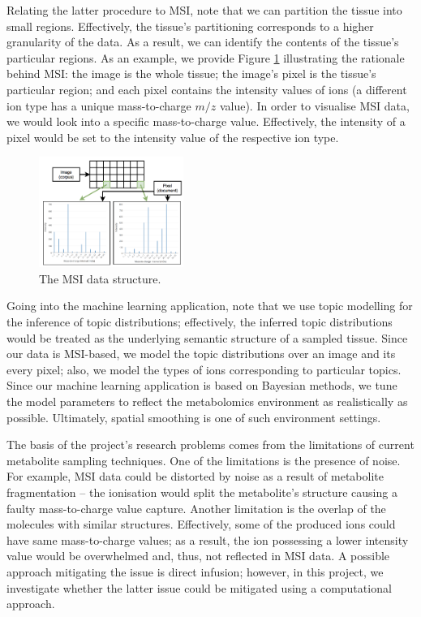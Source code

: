 \documentclass{mpaper}
\begin{document}
\par Relating the latter procedure to MSI, note that we can partition the tissue into small regions. Effectively, the tissue's partitioning corresponds to a higher granularity of the data. As a result, we can identify the contents of the tissue's particular regions. As an example, we provide Figure \ref{fig:msi} illustrating the rationale behind MSI: the image is the whole tissue; the image's pixel is the tissue's particular region; and each pixel contains the intensity values of ions (a different ion type has a unique mass-to-charge $m/z$ value). In order to visualise MSI data, we would look into a specific mass-to-charge value. Effectively, the intensity of a pixel would be set to the intensity value of the respective ion type.

\begin{figure}[h]
  \centering
  \includegraphics[width=0.42\textwidth]{msi3.png}
  \caption{The MSI data structure.}
  \label{fig:msi}
\end{figure}

\par Going into the machine learning application, note that we use topic modelling for the inference of topic distributions; effectively, the inferred topic distributions would be treated as the underlying semantic structure of a sampled tissue. Since our data is MSI-based, we model the topic distributions over an image and its every pixel; also, we model the types of ions corresponding to particular topics. Since our machine learning application is based on Bayesian methods, we tune the model parameters to reflect the metabolomics environment as realistically as possible. Ultimately, spatial smoothing is one of such environment settings.

\par The basis of the project's research problems comes from the limitations of current metabolite sampling techniques. One of the limitations is the presence of noise. For example, MSI data could be distorted by noise as a result of metabolite fragmentation -- the ionisation would split the metabolite's structure causing a faulty mass-to-charge value capture. Another limitation is the overlap of the molecules with similar structures. Effectively, some of the produced ions could have same mass-to-charge values; as a result, the ion possessing a lower intensity value would be overwhelmed and, thus, not reflected in MSI data. A possible approach mitigating the issue is direct infusion; however, in this project, we investigate whether the latter issue could be mitigated using a computational approach.
\end{document}
